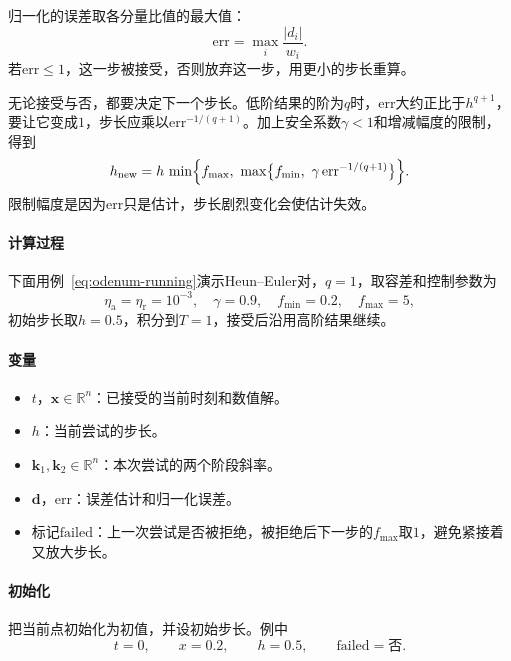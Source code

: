 归一化的误差取各分量比值的最大值：
\begin{equation}
 \mathrm{err}=\max_{i}\frac{\lvert d_i\rvert}{w_i}.
 \label{eq:odenum-err}
\end{equation}
若$\mathrm{err}\leq1$，这一步被接受，否则放弃这一步，用更小的步长重算。

无论接受与否，都要决定下一个步长。低阶结果的阶为$q$时，$\mathrm{err}$大约正比于$h^{q+1}$，要让它变成$1$，步长应乘以$\mathrm{err}^{-1/(q+1)}$。加上安全系数$\gamma<1$和增减幅度的限制，得到
\begin{equation}
 h_{\mathrm{new}}=h\,\min\Bigl\{f_{\max},\ \max\bigl\{f_{\min},\ \gamma\,\mathrm{err}^{-1/(q+1)}\bigr\}\Bigr\}.
 \label{eq:odenum-step-control}
\end{equation}
限制幅度是因为$\mathrm{err}$只是估计，步长剧烈变化会使估计失效。

\paragraph{计算过程}
下面用例~\eqref{eq:odenum-running}演示Heun--Euler对，$q=1$，取容差和控制参数为
\[
 \eta_{\mathrm{a}}=\eta_{\mathrm{r}}=10^{-3},\quad\gamma=0.9,\quad f_{\min}=0.2,\quad f_{\max}=5,
\]
初始步长取$h=0.5$，积分到$T=1$，接受后沿用高阶结果继续。

\paragraph{变量}
\begin{itemize}
 \item $t$，$\bm{x}\in\mathbb{R}^{n}$：已接受的当前时刻和数值解。
 \item $h$：当前尝试的步长。
 \item $\bm{k}_1,\bm{k}_2\in\mathbb{R}^{n}$：本次尝试的两个阶段斜率。
 \item $\bm{d}$，$\mathrm{err}$：误差估计和归一化误差。
 \item 标记$\mathrm{failed}$：上一次尝试是否被拒绝，被拒绝后下一步的$f_{\max}$取$1$，避免紧接着又放大步长。
\end{itemize}

\paragraph{初始化}
把当前点初始化为初值，并设初始步长。例中
\[
 t=0,\qquad x=0.2,\qquad h=0.5,\qquad \mathrm{failed}=\text{否}.
\]

